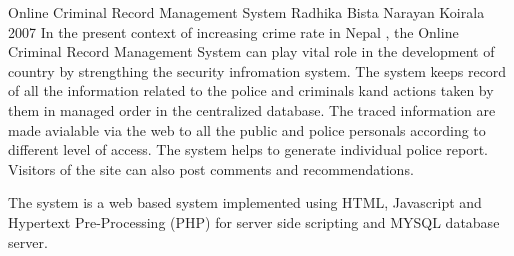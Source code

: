  \begin{conf-abstract}[]
{Online Criminal Record Management System }
{
Radhika Bista
Narayan Koirala
}
{ 2007 }
In the present context of increasing crime rate in Nepal , the Online Criminal Record Management System can play vital role in the development of country by strengthing the security infromation system. The system keeps record of all the information related to the police and criminals kand actions taken by them in managed order in the centralized database. The traced information are made avialable via the web to all the public and police personals according to different level of access. The system helps to generate individual police report. Visitors of the site can also post comments and recommendations.

The system is a web based system implemented using HTML, Javascript and Hypertext Pre-Processing (PHP) for server side scripting and MYSQL database server.
  \end{conf-abstract}